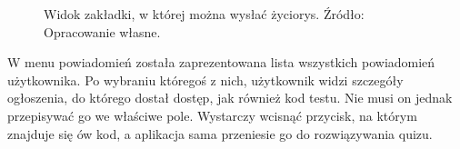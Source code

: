 \documentclass[twoside]{projektInzynierskiMS}
\numberwithin{figure}{section}
\begin{document}
\begin{figure}[h!]
\caption{Widok zakładki, w której można wysłać życiorys. Źródło: Opracowanie własne.}
\label{fig:mobile_upload_cv}
\end{figure}
\newpage
W menu powiadomień została zaprezentowana lista wszystkich powiadomień użytkownika. Po wybraniu któregoś z nich, użytkownik widzi szczegóły ogłoszenia, do którego dostał dostęp, jak również kod testu. Nie musi on jednak przepisywać go we właściwe pole. Wystarczy wcisnąć przycisk, na którym znajduje się ów kod, a aplikacja sama przeniesie go do rozwiązywania quizu.
\end{document}
